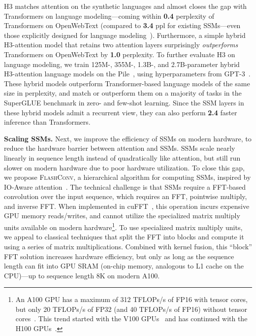 \documentclass{article}
\newcommand{\fastfft}{\textsc{FlashConv}\xspace}
\newcommand{\hthree}{\textsc{H3}\xspace}
\newcommand{\num}[1]{{\color{red}\bf{#1}\normalfont}}
\newcommand{\num}[1]{#1}
\begin{document}
\hthree matches attention on the synthetic languages and almost closes the gap with Transformers on language modeling---coming within \num{0.4} perplexity of Transformers on OpenWebText (compared to \num{3.4} ppl for existing SSMs---even those explicitly designed for language modeling~\citep{mehta2022long}).
Furthermore, a simple hybrid \hthree-attention model that retains two attention layers surprisingly \textit{outperforms} Transformers on OpenWebText by \num{1.0} perplexity.
To further evaluate \hthree on language modeling, we train 125M-, 355M-, 1.3B-, and 2.7B-parameter hybrid \hthree-attention language models on the Pile~\citep{gao2020pile}, using hyperparameters from GPT-3~\citep{brown2020language}.
These hybrid models outperform Transformer-based language models of the same size in perplexity, and match or outperform them on a majority of tasks in the SuperGLUE benchmark in zero- and few-shot learning.
Since the SSM layers in these hybrid models admit a recurrent view, they can also perform \num{2.4} faster inference than Transformers.


\textbf{Scaling SSMs.}
Next, we improve the efficiency of SSMs on modern hardware, to reduce the hardware barrier between attention and SSMs.
SSMs scale nearly linearly in sequence length instead of quadratically like attention, but still run slower on modern hardware due to poor hardware utilization.
To close this gap, we propose \fastfft, a hierarchical algorithm for computing SSMs, inspired by IO-Aware attention~\citep{dao2022flashattention}.
The technical challenge is that SSMs require a FFT-based convolution over the input sequence, which requires an FFT, pointwise multiply, and inverse FFT.
When implemented in cuFFT~\citep{cufft}, this operation incurs expensive GPU memory reads/writes, and cannot utilize the specialized matrix multiply units available on modern hardware\footnote{An A100 GPU has a maximum of 312 TFLOPs/s of FP16 with
tensor cores, but only 20 TFLOPs/s of FP32 (and 40 TFLOPs/s of FP16) without
tensor cores~\citep{nvidia2020nvidia}. This trend started with the V100 GPUs~\citep{nvidia2017nvidia} and has continued with the
H100 GPUs~\citep{nvidia2022nvidia}.}.
To use specialized matrix multiply units, we appeal to classical techniques that split the FFT into blocks and compute it using a series of matrix multiplications.
Combined with kernel fusion, this ``block'' FFT solution increases hardware efficiency, but only as long as the sequence length can fit into GPU SRAM (on-chip memory, analogous to L1 cache on the CPU)---up to sequence length 8K on modern A100.
\end{document}
